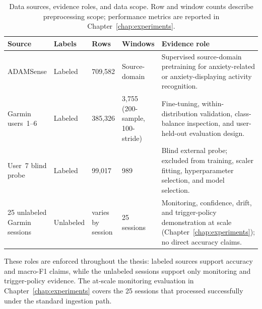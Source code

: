 \renewcommand{\arraystretch}{1.18}
\begin{table}[htbp]
\centering
\footnotesize
\caption[Data sources, evidence roles, and data scope]{Data sources, evidence roles, and data scope. Row and window counts describe preprocessing scope; performance metrics are reported in Chapter~\ref{chap:experiments}.}
\label{tab:data_sources_roles}
\begin{tabularx}{\textwidth}{p{2.6cm} p{1.4cm} p{1.7cm} p{2.4cm} X}
\toprule
\textbf{Source} & \textbf{Labels} & \textbf{Rows} & \textbf{Windows} & \textbf{Evidence role} \\
\midrule
ADAMSense \cite{khan2021adamsense}
& Labeled & 709,582 & Source-domain
& Supervised source-domain pretraining for anxiety-related or anxiety-displaying activity recognition. \\

Garmin users~1--6
& Labeled & 385,326 & 3,755 (200-sample, 100-stride)
& Fine-tuning, within-distribution validation, class-balance inspection, and user-held-out evaluation design. \\

User~7 blind probe
& Labeled & 99,017 & 989
& Blind external probe; excluded from training, scaler fitting, hyperparameter selection, and model selection. \\

25 unlabeled Garmin sessions
& Unlabeled & varies by session & 25 sessions
& Monitoring, confidence, drift, and trigger-policy demonstration at scale (Chapter~\ref{chap:experiments}); no direct accuracy claims. \\
\bottomrule
\end{tabularx}
\renewcommand{\arraystretch}{1.0}
\end{table}

These roles are enforced throughout the thesis: labeled sources support accuracy and macro-F1 claims, while the unlabeled sessions support only monitoring and trigger-policy evidence. The at-scale monitoring evaluation in Chapter~\ref{chap:experiments} covers the 25 sessions that processed successfully under the standard ingestion path.

